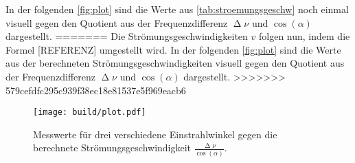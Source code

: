 \noindent
In der folgenden \autoref{fig:plot} sind die Werte aus \autoref{tab:stroemungsgeschw} noch einmal visuell gegen den Quotient aus der Frequenzdifferenz $\upDelta \nu$ und $\cos(\alpha)$
dargestellt.
=======
Die Strömungsgeschwindigkeiten $v$ folgen nun, indem die Formel [REFERENZ] umgestellt wird. In der folgenden \autoref{fig:plot} sind die Werte aus der 
berechneten Strömungsgeschwindigkeiten visuell gegen den Quotient aus der Frequenzdifferenz $\upDelta \nu$ und $\cos(\alpha)$ dargestellt.
>>>>>>> 579cefdfc295c939f38ec18e81537e5f969eacb6
\begin{figure}[H]
  \centering
  \texttt{[image: build/plot.pdf]}
  \caption{Messwerte für drei verschiedene Einstrahlwinkel gegen die berechnete Strömungsgeschwindigkeit $\frac{\upDelta\nu}{\cos(\alpha)}$.}
  \label{fig:plot}
\end{figure}

